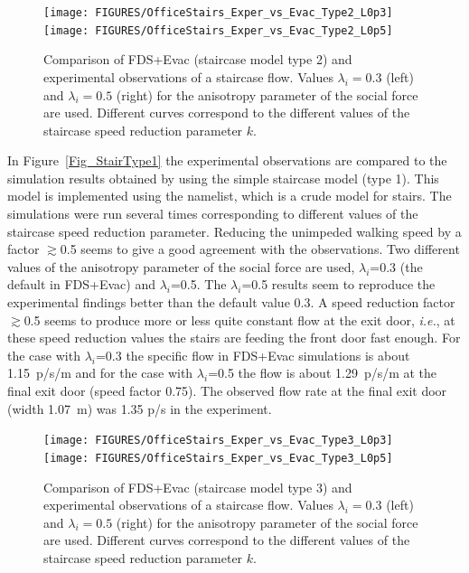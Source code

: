 \documentclass[12pt,a4paper,final,twoside]{stylevk}
\begin{document}
\begin{enumerate}
%
\begin{figure}[!tb]
  \centerline{\texttt{[image: FIGURES/OfficeStairs\_Exper\_vs\_Evac\_Type2\_L0p3]}\texttt{[image: FIGURES/OfficeStairs\_Exper\_vs\_Evac\_Type2\_L0p5]}}
  \caption{Comparison of FDS+Evac (staircase model type 2) and
    experimental observations of a staircase flow.  Values
    $\lambda_i=0.3$ (left) and $\lambda_i=0.5$ (right) for the
    anisotropy parameter of the social force are used.  Different
    curves correspond to the different values of the staircase speed
    reduction parameter $k$.}\label{Fig_StairType2}
\end{figure}

In Figure~\ref{Fig_StairType1} the experimental observations are
compared to the simulation results obtained by using the simple
staircase model (type 1).  This model is implemented using the
 namelist, which is a crude model for stairs.  The
simulations were run several times corresponding to different values
of the staircase speed reduction parameter.  Reducing the unimpeded
walking speed by a factor $\gtrsim$0.5 seems to give a good agreement
with the observations.  Two different values of the anisotropy
parameter of the social force are used, $\lambda_i$=0.3 (the default
in FDS+Evac) and $\lambda_i$=0.5.  The $\lambda_i$=0.5 results seem to
reproduce the experimental findings better than the default value 0.3.
A speed reduction factor $\gtrsim$0.5 seems to produce more or less
quite constant flow at the exit door, \emph{i.e.}, at these speed
reduction values the stairs are feeding the front door fast enough.
For the case with $\lambda_i$=0.3 the specific flow in FDS+Evac
simulations is about 1.15~p/s/m and for the case with $\lambda_i$=0.5
the flow is about 1.29~p/s/m at the final exit door (speed factor
0.75).  The observed flow rate at the final exit door (width 1.07~m)
was 1.35 p/s in the experiment.
%

%
\begin{figure}[!tb]
  \centerline{\texttt{[image: FIGURES/OfficeStairs\_Exper\_vs\_Evac\_Type3\_L0p3]}\texttt{[image: FIGURES/OfficeStairs\_Exper\_vs\_Evac\_Type3\_L0p5]}}
  \caption{Comparison of FDS+Evac (staircase model type 3) and
    experimental observations of a staircase flow.  Values
    $\lambda_i=0.3$ (left) and $\lambda_i=0.5$ (right) for the
    anisotropy parameter of the social force are used.  Different
    curves correspond to the different values of the staircase speed
    reduction parameter $k$.}\label{Fig_StairType3}
\end{figure}


\end{enumerate}
\end{document}
